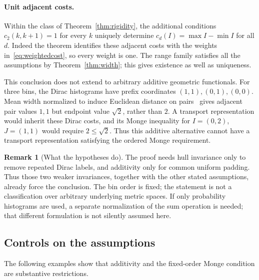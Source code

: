 \documentclass[11pt]{article}
\theoremstyle{definition}\newtheorem{definition}[theorem]{Definition}
\newtheorem{remark}[theorem]{Remark}
\newcommand{\1}{\mathbf 1}
\begin{document}
\paragraph{Unit adjacent costs.}
Within the class of Theorem~\ref{thm:rigidity}, the additional conditions
$c_2(k,k+1)=1$ for every $k$ uniquely determine $c_d(I)=\max I-\min I$ for
all $d$. Indeed the theorem identifies these adjacent costs with the weights
in~\eqref{eq:weightedcost}, so every weight is one. The range family satisfies
all the assumptions by Theorem~\ref{thm:width}; this gives existence as well
as uniqueness.

This conclusion does not extend to arbitrary additive geometric functionals.
For three bins, the Dirac histograms have prefix coordinates $(1,1),(0,1),(0,0)$.
Mean width normalized to induce Euclidean distance on pairs~\cite[Section 2.1]{bt}
gives adjacent pair values $1,1$ but endpoint value $\sqrt2$, rather than $2$.
A transport representation would inherit these Dirac costs, and its Monge
inequality for $I=(0,2)$, $J=(1,1)$ would require $2\le\sqrt2$. Thus this
additive alternative cannot have a transport representation satisfying the
ordered Monge requirement.

\begin{remark}[What the hypotheses do]
The proof needs hull invariance only to remove repeated Dirac labels, and
additivity only for common uniform padding. Thus those two weaker invariances,
together with the other stated assumptions, already force the conclusion.
The bin order is fixed; the statement is not a classification over arbitrary
underlying metric spaces. If only probability histograms are used, a separate
normalization of the sum operation is needed; that different formulation is not
silently assumed here.
\end{remark}

\subsection{Controls on the assumptions}
The following examples show that additivity and the fixed-order Monge condition
are substantive restrictions.
\end{document}
